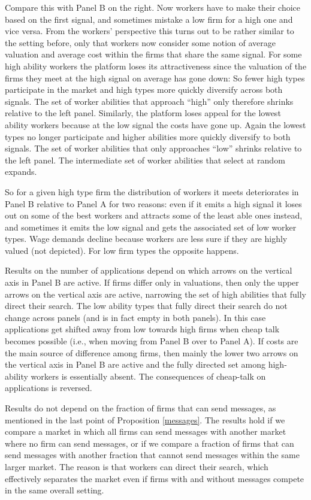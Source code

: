 \documentclass[12pt]{article}
\begin{document}
Compare this with Panel B on the right. Now workers have to make their choice based on the first signal, and sometimes mistake a low firm for a high one and vice versa. From the workers' perspective this turns out to be rather similar to the setting before, only that workers now consider some notion of average valuation and average cost within the firms that share the same signal. For some high ability workers the platform loses its attractiveness since the valuation of the firms they meet at the high signal on average has gone down: So fewer high types participate in the market and high types more quickly diversify across both signals. The set of worker abilities that approach ``high'' only therefore shrinks relative to the left panel. Similarly, the platform loses appeal for the lowest ability workers because at the low signal the costs have gone up. Again the lowest types no longer participate and higher abilities more quickly diversify to both signals. The set of worker abilities that only approaches ``low'' shrinks relative to the left panel. The intermediate set of worker abilities that select at random expands. 

So for a given high type firm the distribution of workers it meets deteriorates in Panel B relative to Panel A for two reasons: even if it emits a high signal it loses out on some of the best workers and attracts some of the least able ones instead, and sometimes it emits the low signal and gets the associated set of low worker types. Wage demands decline because workers are less sure if they are highly valued (not depicted). For low firm types the opposite happens. 

Results on the number of applications depend on which arrows on the vertical axis in Panel B are active. If firms differ only in valuations, then only the upper arrows on the vertical axis are active, narrowing the set of high abilities that fully direct their search. The low ability types that fully direct their search do not change across panels (and is in fact empty in both panels). In this case applications get shifted away from low towards high firms when cheap talk becomes possible (i.e., when moving from Panel B over to Panel A). If costs are the main source of difference among firms, then mainly the lower two arrows on the vertical axis in Panel B are active and the fully directed set among high-ability workers is essentially absent. The consequences of cheap-talk on applications is reversed.

Results do not depend on the fraction of firms that can send messages, as mentioned in the last point of Proposition \ref{messages}. The results hold if we compare a market in which all firms can send messages with another market where no firm can send messages, or if we compare a fraction of firms that can send messages with another fraction that cannot send messages within the same larger market. The reason is that workers can direct their search, which effectively separates the market even if firms with and without messages compete in the same overall setting.  
\end{document}
